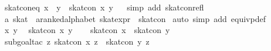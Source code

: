 \begin{isabellebody}
\isanewline
{}\isamarkupfalse%
\ skat{}con{}eq{}\ {}x\ {}\ y\ {}\ skat{}con\ x\ y{}%
\isadelimproof
\ %
\endisadelimproof
%
\isatagproof
{}\isamarkupfalse%
\ {}simp\ add{}\ skat{}con{}refl{}%
\endisatagproof
{\isafoldproof}%
%
\isadelimproof
%
\endisadelimproof
\isanewline
\isanewline
{}\isamarkupfalse%
\ {}a\ skat\ {}\ {}{}a{}{}ranked{}alphabet\ skat{}expr{}\ {}\ skat{}con\isanewline
%
\isadelimproof
%
\endisadelimproof
%
\isatagproof
{}\isamarkupfalse%
\ {}auto\ simp\ add{}\ equivp{}def{}\isanewline
\ \ \isamarkupfalse%
\ x\ y\ \isamarkupfalse%
\ {}skat{}con\ x\ y{}\isanewline
\ \ \isamarkupfalse%
\ {}skat{}con\ x\ {}\ skat{}con\ y{}\isanewline
\ \ \ \ \isamarkupfalse%
\ {}subgoal{}tac\ {}{}z{}\ skat{}con\ x\ z\ {}\ skat{}con\ y\ z{}{}\isanewline
\ \ \ \ \isamarkupfalse%

\end{isabellebody}
